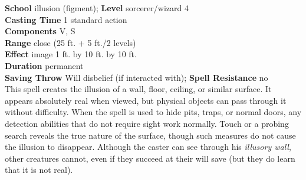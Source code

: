 \textbf{School} illusion (figment); \textbf{Level} sorcerer/wizard 4\\
\textbf{Casting Time} 1 standard action\\
\textbf{Components} V, S\\
\textbf{Range} close (25 ft. + 5 ft./2 levels)\\
\textbf{Effect} image 1 ft. by 10 ft. by 10 ft.\\
\textbf{Duration} permanent\\
\textbf{Saving Throw }Will disbelief (if interacted with); \textbf{Spell Resistance} no\\
This spell creates the illusion of a wall, floor, ceiling, or similar surface. It appears absolutely real when viewed, but physical objects can pass through it without difficulty. When the spell is used to hide pits, traps, or normal doors, any detection abilities that do not require sight work normally. Touch or a probing search reveals the true nature of the surface, though such measures do not cause the illusion to disappear. Although the caster can see through his \textit{illusory wall}, other creatures cannot, even if they succeed at their will save (but they do learn that it is not real).\\
